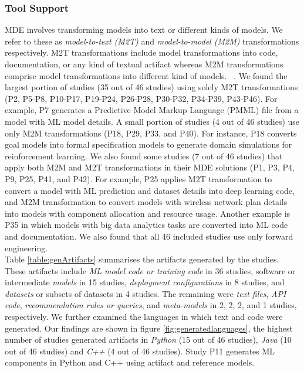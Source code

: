 \subsubsection{Tool Support}
 MDE involves transforming models into text or different kinds of models. We refer to these as \textit{model-to-text (M2T)} and \textit{model-to-model (M2M)} transformations respectively. M2T transformations include model transformations into code, documentation, or any kind of textual artifact whereas M2M transformations comprise model transformations into different kind of models. ~\cite{brambilla2017model}. We found the largest portion of studies (35 out of 46 studies) using solely M2T transformations (P2, P5-P8, P10-P17, P19-P24, P26-P28, P30-P32, P34-P39, P43-P46). For example, P7 generates a Predictive Model Markup Language (PMML) file from a model with ML model details. A small portion of studies (4 out of 46 studies) use only M2M transformations (P18, P29, P33, and P40). For instance, P18 converts goal models into formal specification models to generate domain simulations for reinforcement learning. We also found some studies (7 out of 46 studies) that apply both M2M and M2T transformations in their MDE solutions (P1, P3, P4, P9, P25, P41, and P42). For example, P25 applies M2T transformation to convert a model with ML prediction and dataset details into deep learning code, and M2M transformation to convert models with wireless network plan details into models with component allocation and resource usage. Another example is P35 in which models with big data analytics tasks are converted into ML code and documentation. We also found that all 46 included studies use only forward engineering.\\

 Table \ref{table:genArtifacts} summarises the artifacts generated by the studies. These artifacts include \textit{ML model code or training code} in 36 studies, software or intermediate \textit{models} in 15 studies, \textit{deployment configurations} in 8 studies, and \textit{datasets} or subsets of datasets in 4 studies. The remaining were \textit{text files}, \textit{API code}, \textit{recommendation rules or queries}, and \textit{meta-models} in 2, 2, 2, and 1 studies, respectively. We further examined the languages in which text and code were generated. Our findings are shown in figure \ref{fig:generatedlanguages}, the highest number of studies generated artifacts in \textit{Python} (15 out of 46 studies), \textit{Java} (10 out of 46 studies) and \textit{C++} (4 out of 46 studies). Study P11 generates ML components in Python and C++ using artifact and reference models. \\

